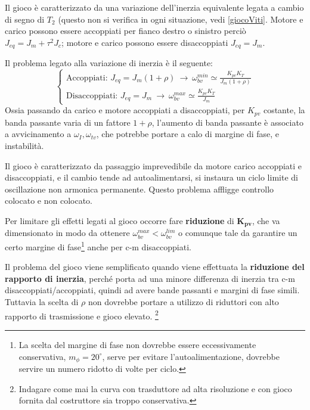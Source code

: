 Il gioco è caratterizzato da una variazione dell'inerzia equivalente legata a cambio di segno di \(T_2\) (questo non si verifica in ogni situazione, vedi \ref{giocoViti}. 
Motore e carico possono essere accoppiati per fianco destro o sinistro perciò \(J_{eq} = J_m + \tau^2 J_c\); motore e carico possono essere disaccoppiati \(J_{eq} = J_m\).

Il problema legato alla variazione di inerzia è il seguente:
\[
\begin{cases}
    \text{Accoppiati: } J_{eq} = J_m (1+\rho) \ \rightarrow \ \omega_{bv}^{min} \simeq \frac{K_{pv}K_T}{J_m(1+\rho)} \\
    \text{Disaccoppiati: } J_{eq} = J_m \ \rightarrow \ \omega_{bv}^{max} \simeq \frac{K_{pv} K_T}{J_m}
\end{cases}
\]
Ossia passando da carico e motore accoppiati a disaccoppiati, per \(K_{pv}\) costante, la banda passante varia di un fattore \(1+\rho\), l'aumento di banda passante è associato a avvicinamento a \(\omega_I,\omega_{tv}\), che potrebbe portare a calo di margine di fase, e instabilità.

Il gioco è caratterizzato da passaggio imprevedibile da motore carico accoppiati e disaccoppiati, e il cambio tende ad autoalimentarsi, si instaura un ciclo limite di oscillazione non armonica permanente.
Questo problema affligge controllo colocato e non colocato.

Per limitare gli effetti legati al gioco occorre fare \textbf{riduzione} di \(\mathbf{K_{pv}}\), che va dimensionato in modo da ottenere \(\omega_{bv}^{max} < \omega_{bv}^{lim}\) o comunque tale da garantire un certo margine di fase\footnote{La scelta del margine di fase non dovrebbe essere eccessivamente conservativa, \(m_\phi = 20^\circ\), serve per evitare l'autoalimentazione, dovrebbe servire un numero ridotto di volte per ciclo.} anche per c-m disaccoppiati.

Il problema del gioco viene semplificato quando viene effettuata la \textbf{riduzione del rapporto di inerzia}, perché porta ad una minore differenza di inerzia tra c-m disaccoppiati/accoppiati, quindi ad avere bande passanti e margini di fase simili.
Tuttavia la scelta di \(\rho\) non dovrebbe portare a utilizzo di riduttori con alto rapporto di trasmissione e gioco elevato. \footnote{Indagare come mai la curva con trasduttore ad alta risoluzione e con gioco fornita dal costruttore sia troppo conservativa.}

